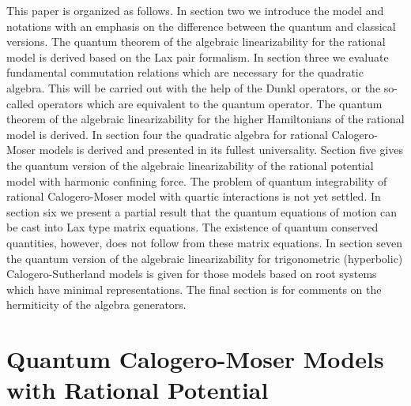 \documentclass[a4paper,12pt]{article}
\begin{document}
This paper is organized as follows. In section two we introduce
the model and notations with an emphasis on the difference
between the quantum and classical versions. The quantum theorem
of the algebraic linearizability for the rational model is derived
based on the Lax pair formalism.
In section three we evaluate fundamental commutation relations
which are necessary for the quadratic algebra.
This will be carried out with the help of the Dunkl operators, or the
so-called \myHighlight{$\ell$}\coordHE{} operators which are equivalent to the quantum \coordHE{}
operator.
The quantum theorem of the algebraic linearizability for the
higher Hamiltonians of
the rational model is derived.
In section four the quadratic algebra for rational Calogero-Moser models
is derived and presented in its fullest universality.
Section five gives the quantum version of the algebraic linearizability
of the rational potential model with harmonic confining force.
The problem of quantum integrability of rational Calogero-Moser model
with quartic interactions is not yet settled.
In section six we present a partial result
that the quantum equations of motion can be cast into
 Lax type matrix equations. The existence of quantum conserved
quantities, however, does not follow from these matrix
equations. In section seven the quantum version of the
algebraic linearizability for trigonometric (hyperbolic)
Calogero-Sutherland models is given for those models based on
root systems which have minimal representations. The final
section is for comments on the hermiticity of the algebra
generators.



\section{Quantum Calogero-Moser Models with Rational Potential}
\label{cal-mo}
\setcounter{equation}{0}
\end{document}
